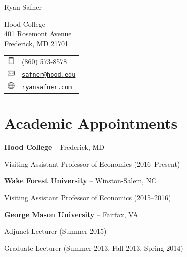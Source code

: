 \documentclass[]{article}
\title{}
\author{}
\date{}
\newcommand{\name}{Ryan Safner}
\renewenvironment{itemize}{
  \begin{list}{}{
    \setlength{\leftmargin}{1.5em}
  }
}{
  \end{list}
}
\begin{document}
\Huge \sffamily \name

\vspace{0.25in}

\small \familydefault

\begin{minipage}{0.45\linewidth}
  Hood College\\
  401 Rosemont Avenue\\
  Frederick, MD 21701\\
\end{minipage}\begin{minipage}{0.45\linewidth}
  \begin{tabular}{ll}
    \includegraphics[height=1em]{cell.png} & (860) 573-8578 \\
    \includegraphics[height=1em]{mail.png}& \href{mailto:safner@hood.edu}{\tt safner@hood.edu} \\
    \includegraphics[height=1em]{web.png} & \href{http://ryansafner.com}{\tt ryansafner.com} \\
  \end{tabular}
\end{minipage}

\section*{Academic Appointments}\begin{itemize}
    \item \textbf{Hood College} -- Frederick, MD
    \begin{itemize}
        \item Visiting Assistant Professor of Economics (2016--Present) 
    \end{itemize}
    \item \textbf{Wake Forest University} -- Winston-Salem, NC
    \begin{itemize}
        \item Visiting Assistant Professor of Economics (2015--2016)
    \end{itemize}   
    \item \textbf{George Mason University} -- Fairfax, VA
    \begin{itemize}
        \item Adjunct Lecturer (Summer 2015)
        \item Graduate Lecturer (Summer 2013, Fall 2013, Spring 2014)
    \end{itemize} 
\end{itemize}
\end{document}
